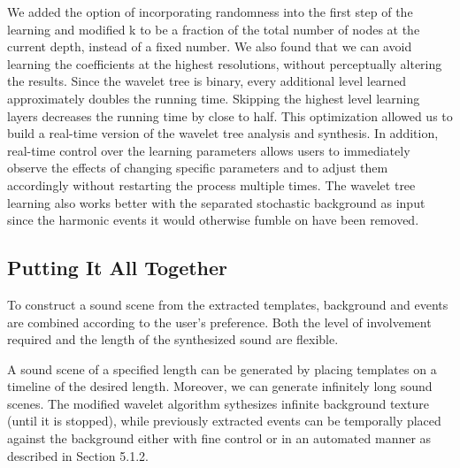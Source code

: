 \documentclass{acmsiggraph}               %
\begin{document}
We added the option of incorporating randomness into the first step of 
the learning and modified k to be a fraction of the total number of 
nodes at the current depth, instead of a fixed number. We also found 
that we can avoid learning the coefficients at the highest resolutions, 
without perceptually altering the results. Since the wavelet tree is binary, every additional 
level learned approximately doubles the running time. Skipping the highest level learning
layers decreases the running time by close to half. 
This optimization allowed us to build a real-time version of the wavelet tree analysis and synthesis. 
In addition, real-time control over the learning parameters allows 
users to immediately observe the effects of changing specific parameters 
and to adjust them accordingly without restarting the process multiple times. 
The wavelet tree learning also works better with the separated stochastic background 
as input since the harmonic events it would otherwise fumble on have been removed. 


\subsection{Putting It All Together}


To construct a sound scene from the extracted templates, background and events are combined 
according to the user's preference. Both the level of involvement required and the 
length of the synthesized sound are flexible. 

A sound scene of a specified length can be generated by placing templates 
on a timeline of the desired length. Moreover, we can generate infinitely long sound 
scenes. The modified wavelet algorithm sythesizes infinite background texture (until it 
is stopped), while previously extracted events can be temporally placed against the 
background either with fine control or in an automated manner as described in Section 5.1.2. 
\end{document}
